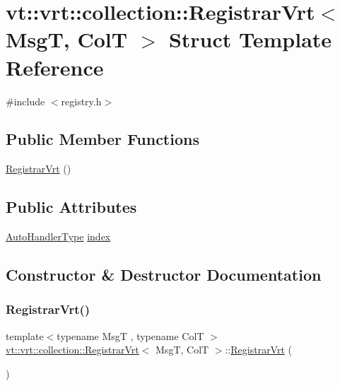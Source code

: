 \hypertarget{structvt_1_1vrt_1_1collection_1_1_registrar_vrt}{}\section{vt\+:\+:vrt\+:\+:collection\+:\+:Registrar\+Vrt$<$ MsgT, ColT $>$ Struct Template Reference}
\label{structvt_1_1vrt_1_1collection_1_1_registrar_vrt}


{\ttfamily \#include $<$registry.\+h$>$}

\subsection*{Public Member Functions}
\begin{DoxyCompactItemize}
\item 
\hyperlink{structvt_1_1vrt_1_1collection_1_1_registrar_vrt_ac5abaafb91cf501b88a6692bfc0a8d54}{Registrar\+Vrt} ()
\end{DoxyCompactItemize}
\subsection*{Public Attributes}
\begin{DoxyCompactItemize}
\item 
\hyperlink{namespacevt_1_1vrt_1_1collection_af50831782f9d77f86d626f858f295c37}{Auto\+Handler\+Type} \hyperlink{structvt_1_1vrt_1_1collection_1_1_registrar_vrt_a692b1c21f096657dbbc856d91cf178f0}{index}
\end{DoxyCompactItemize}


\subsection{Constructor \& Destructor Documentation}
\mbox{\label{structvt_1_1vrt_1_1collection_1_1_registrar_vrt_ac5abaafb91cf501b88a6692bfc0a8d54}} 
\subsubsection{\texorpdfstring{Registrar\+Vrt()}{RegistrarVrt()}}
{\footnotesize\ttfamily template$<$typename MsgT , typename ColT $>$ \\
\hyperlink{structvt_1_1vrt_1_1collection_1_1_registrar_vrt}{vt\+::vrt\+::collection\+::\+Registrar\+Vrt}$<$ MsgT, ColT $>$\+::\hyperlink{structvt_1_1vrt_1_1collection_1_1_registrar_vrt}{Registrar\+Vrt} (\begin{DoxyParamCaption}{ }\end{DoxyParamCaption})}




